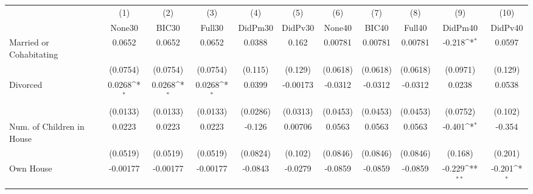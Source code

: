 {
\def\sym#1{\ifmmode^{#1}\else\(^{#1}\)\fi}
\begin{tabular}{l*{10}{c}}
\toprule
            &\multicolumn{1}{c}{(1)}&\multicolumn{1}{c}{(2)}&\multicolumn{1}{c}{(3)}&\multicolumn{1}{c}{(4)}&\multicolumn{1}{c}{(5)}&\multicolumn{1}{c}{(6)}&\multicolumn{1}{c}{(7)}&\multicolumn{1}{c}{(8)}&\multicolumn{1}{c}{(9)}&\multicolumn{1}{c}{(10)}\\
            &\multicolumn{1}{c}{None30}&\multicolumn{1}{c}{BIC30}&\multicolumn{1}{c}{Full30}&\multicolumn{1}{c}{DidPm30}&\multicolumn{1}{c}{DidPv30}&\multicolumn{1}{c}{None40}&\multicolumn{1}{c}{BIC40}&\multicolumn{1}{c}{Full40}&\multicolumn{1}{c}{DidPm40}&\multicolumn{1}{c}{DidPv40}\\
\midrule
Married or Cohabitating&      0.0652         &      0.0652         &      0.0652         &      0.0388         &       0.162         &     0.00781         &     0.00781         &     0.00781         &      -0.218\sym{*}  &      0.0597         \\
            &    (0.0754)         &    (0.0754)         &    (0.0754)         &     (0.115)         &     (0.129)         &    (0.0618)         &    (0.0618)         &    (0.0618)         &    (0.0971)         &     (0.129)         \\
\addlinespace
Divorced    &      0.0268\sym{*}  &      0.0268\sym{*}  &      0.0268\sym{*}  &      0.0399         &    -0.00173         &     -0.0312         &     -0.0312         &     -0.0312         &      0.0238         &      0.0538         \\
            &    (0.0133)         &    (0.0133)         &    (0.0133)         &    (0.0286)         &    (0.0313)         &    (0.0453)         &    (0.0453)         &    (0.0453)         &    (0.0752)         &     (0.102)         \\
\addlinespace
Num. of Children in House&      0.0223         &      0.0223         &      0.0223         &      -0.126         &     0.00706         &      0.0563         &      0.0563         &      0.0563         &      -0.401\sym{*}  &      -0.354         \\
            &    (0.0519)         &    (0.0519)         &    (0.0519)         &    (0.0824)         &     (0.102)         &    (0.0846)         &    (0.0846)         &    (0.0846)         &     (0.168)         &     (0.201)         \\
\addlinespace
Own House   &    -0.00177         &    -0.00177         &    -0.00177         &     -0.0843         &     -0.0279         &     -0.0859         &     -0.0859         &     -0.0859         &      -0.229\sym{**} &      -0.201\sym{*}  \\

\end{tabular}}
